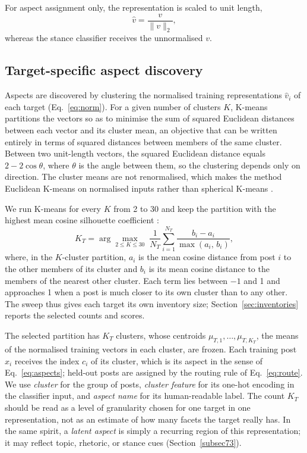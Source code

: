 \documentclass[pdflatex,sn-mathphys-num,iicol]{sn-jnl}%
\begin{document}
For aspect assignment only, the representation is scaled to unit length,
\begin{equation}\label{eq:norm}
\hat{v} = \frac{v}{\lVert v \rVert_2},
\end{equation}
whereas the stance classifier receives the unnormalised \(v\).

\subsection{Target-specific aspect discovery}\label{subsec44}

Aspects are discovered by clustering the normalised training representations \(\hat{v}_i\) of each target (Eq.~\eqref{eq:norm}). For a given number of clusters \(K\), K-means \cite{lloyd1982least} partitions the vectors so as to minimise the sum of squared Euclidean distances between each vector and its cluster mean, an objective that can be written entirely in terms of squared distances between members of the same cluster. Between two unit-length vectors, the squared Euclidean distance equals \(2-2\cos\theta\), where \(\theta\) is the angle between them, so the clustering depends only on direction. The cluster means are not renormalised, which makes the method Euclidean K-means on normalised inputs rather than spherical K-means \cite{dhillon2001concept}.

We run K-means for every \(K\) from 2 to 30 and keep the partition with the highest mean cosine silhouette coefficient \cite{rousseeuw1987silhouettes}:
\begin{equation}\label{eq:silhouette}
K_T = \arg\max_{2 \le K \le 30}\; \frac{1}{N_T}\sum_{i=1}^{N_T} \frac{b_i - a_i}{\max(a_i,\, b_i)},
\end{equation}
where, in the \(K\)-cluster partition, \(a_i\) is the mean cosine distance from post \(i\) to the other members of its cluster and \(b_i\) is its mean cosine distance to the members of the nearest other cluster. Each term lies between \(-1\) and 1 and approaches 1 when a post is much closer to its own cluster than to any other. The sweep thus gives each target its own inventory size; Section~\ref{sec:inventories} reports the selected counts and scores.

The selected partition has \(K_T\) clusters, whose centroids \(\mu_{T,1}, \dots, \mu_{T,K_T}\), the means of the normalised training vectors in each cluster, are frozen. Each training post \(x_i\) receives the index \(c_i\) of its cluster, which is its aspect in the sense of Eq.~\eqref{eq:aspects}; held-out posts are assigned by the routing rule of Eq.~\eqref{eq:route}. We use \emph{cluster} for the group of posts, \emph{cluster feature} for its one-hot encoding in the classifier input, and \emph{aspect name} for its human-readable label. The count \(K_T\) should be read as a level of granularity chosen for one target in one representation, not as an estimate of how many facets the target really has. In the same spirit, a \emph{latent aspect} is simply a recurring region of this representation; it may reflect topic, rhetoric, or stance cues (Section~\ref{subsec73}).
\end{document}
